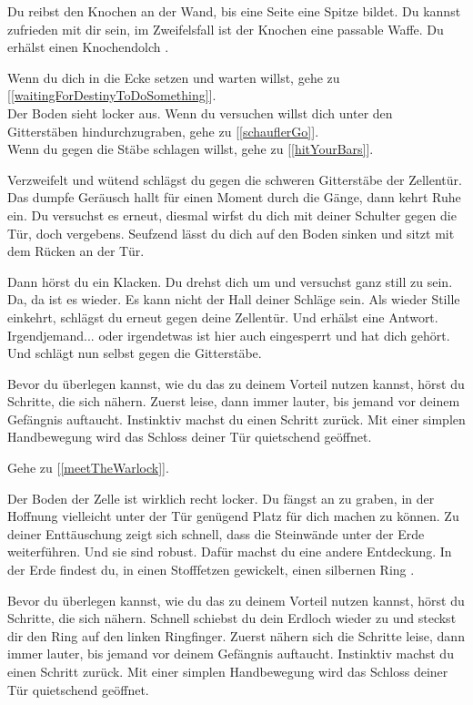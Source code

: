 
Du reibst den Knochen an der Wand, bis eine Seite eine Spitze bildet. Du kannst zufrieden mit dir sein, im Zweifelsfall ist der Knochen eine passable Waffe.
Du erhälst einen Knochendolch .

Wenn du dich in die Ecke setzen und warten willst, gehe zu [\ref{waitingForDestinyToDoSomething}].
\\Der Boden sieht locker aus. Wenn du versuchen willst dich unter den Gitterstäben hindurchzugraben, gehe zu [\ref{schauflerGo}].
\\Wenn du gegen die Stäbe schlagen willst, gehe zu [\ref{hitYourBars}].


Verzweifelt und wütend schlägst du gegen die schweren Gitterstäbe der Zellentür. Das dumpfe Geräusch hallt für einen Moment durch die Gänge, dann kehrt Ruhe ein. Du versuchst es erneut, diesmal wirfst du dich mit deiner Schulter gegen die Tür, doch vergebens. Seufzend lässt du dich auf den Boden sinken und sitzt mit dem Rücken an der Tür.

Dann hörst du ein Klacken. Du drehst dich um und versuchst ganz still zu sein. Da, da ist es wieder. Es kann nicht der Hall deiner Schläge sein. Als wieder Stille einkehrt, schlägst du erneut gegen deine Zellentür. Und erhälst eine Antwort. Irgendjemand... oder irgendetwas ist hier auch eingesperrt und hat dich gehört. Und schlägt nun selbst gegen die Gitterstäbe.

Bevor du überlegen kannst, wie du das zu deinem Vorteil nutzen kannst, hörst du Schritte, die sich nähern. Zuerst leise, dann immer lauter, bis jemand vor deinem Gefängnis auftaucht. Instinktiv machst du einen Schritt zurück. Mit einer simplen Handbewegung wird das Schloss deiner Tür quietschend geöffnet.

Gehe zu [\ref{meetTheWarlock}].


Der Boden der Zelle ist wirklich recht locker. Du fängst an zu graben, in der Hoffnung vielleicht unter der Tür genügend Platz für dich machen zu können. Zu deiner Enttäuschung zeigt sich schnell, dass die Steinwände unter der Erde weiterführen. Und sie sind robust. Dafür machst du eine andere Entdeckung. In der Erde findest du, in einen Stofffetzen gewickelt, einen silbernen Ring .

Bevor du überlegen kannst, wie du das zu deinem Vorteil nutzen kannst, hörst du Schritte, die sich nähern. Schnell schiebst du dein Erdloch wieder zu und steckst dir den Ring auf den linken Ringfinger. Zuerst nähern sich die Schritte leise, dann immer lauter, bis jemand vor deinem Gefängnis auftaucht. Instinktiv machst du einen Schritt zurück. Mit einer simplen Handbewegung wird das Schloss deiner Tür quietschend geöffnet.

